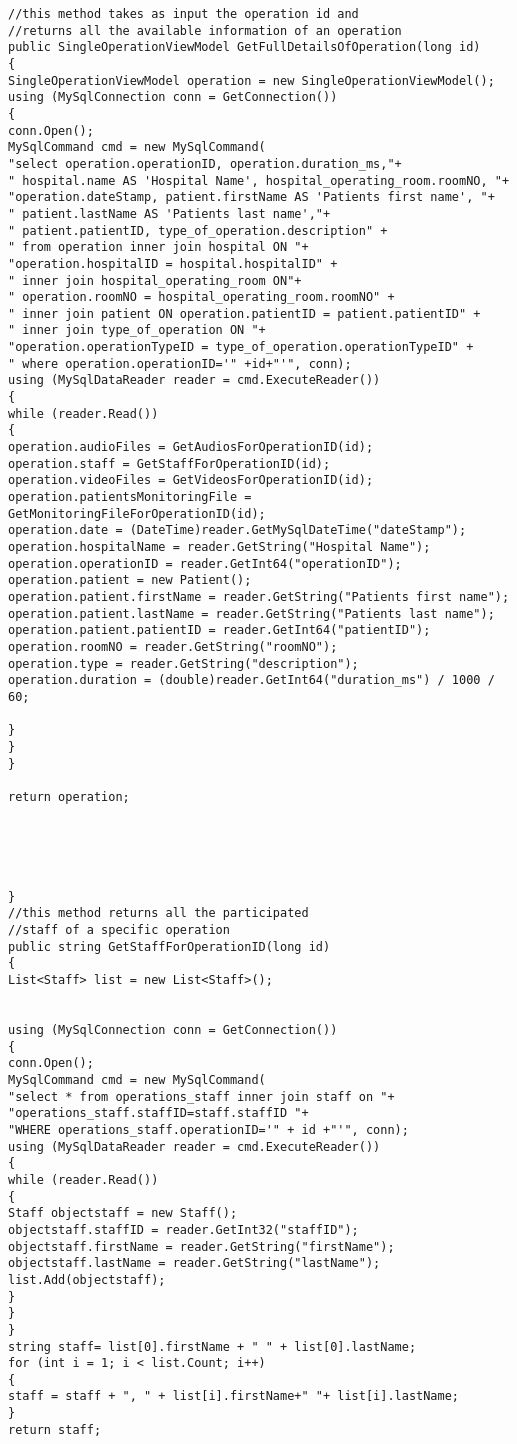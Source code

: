 \begin{lstlisting}
//this method takes as input the operation id and 
//returns all the available information of an operation
public SingleOperationViewModel GetFullDetailsOfOperation(long id)
{
SingleOperationViewModel operation = new SingleOperationViewModel();
using (MySqlConnection conn = GetConnection())
{
conn.Open();
MySqlCommand cmd = new MySqlCommand(
"select operation.operationID, operation.duration_ms,"+
" hospital.name AS 'Hospital Name', hospital_operating_room.roomNO, "+
"operation.dateStamp, patient.firstName AS 'Patients first name', "+
" patient.lastName AS 'Patients last name',"+
" patient.patientID, type_of_operation.description" +
" from operation inner join hospital ON "+
"operation.hospitalID = hospital.hospitalID" +
" inner join hospital_operating_room ON"+
" operation.roomNO = hospital_operating_room.roomNO" +
" inner join patient ON operation.patientID = patient.patientID" +
" inner join type_of_operation ON "+
"operation.operationTypeID = type_of_operation.operationTypeID" +
" where operation.operationID='" +id+"'", conn);
using (MySqlDataReader reader = cmd.ExecuteReader())
{
while (reader.Read())
{
operation.audioFiles = GetAudiosForOperationID(id);
operation.staff = GetStaffForOperationID(id);
operation.videoFiles = GetVideosForOperationID(id);
operation.patientsMonitoringFile = GetMonitoringFileForOperationID(id);
operation.date = (DateTime)reader.GetMySqlDateTime("dateStamp");
operation.hospitalName = reader.GetString("Hospital Name");
operation.operationID = reader.GetInt64("operationID");
operation.patient = new Patient();
operation.patient.firstName = reader.GetString("Patients first name");
operation.patient.lastName = reader.GetString("Patients last name");
operation.patient.patientID = reader.GetInt64("patientID");
operation.roomNO = reader.GetString("roomNO");
operation.type = reader.GetString("description");
operation.duration = (double)reader.GetInt64("duration_ms") / 1000 / 60;

}
}
}

return operation;





}
//this method returns all the participated
//staff of a specific operation
public string GetStaffForOperationID(long id)
{
List<Staff> list = new List<Staff>();


using (MySqlConnection conn = GetConnection())
{
conn.Open();
MySqlCommand cmd = new MySqlCommand(
"select * from operations_staff inner join staff on "+
"operations_staff.staffID=staff.staffID "+
"WHERE operations_staff.operationID='" + id +"'", conn);
using (MySqlDataReader reader = cmd.ExecuteReader())
{
while (reader.Read())
{
Staff objectstaff = new Staff();
objectstaff.staffID = reader.GetInt32("staffID");
objectstaff.firstName = reader.GetString("firstName");
objectstaff.lastName = reader.GetString("lastName");
list.Add(objectstaff);
}
}
}
string staff= list[0].firstName + " " + list[0].lastName;
for (int i = 1; i < list.Count; i++)
{
staff = staff + ", " + list[i].firstName+" "+ list[i].lastName;
}
return staff;


\end{lstlisting}
